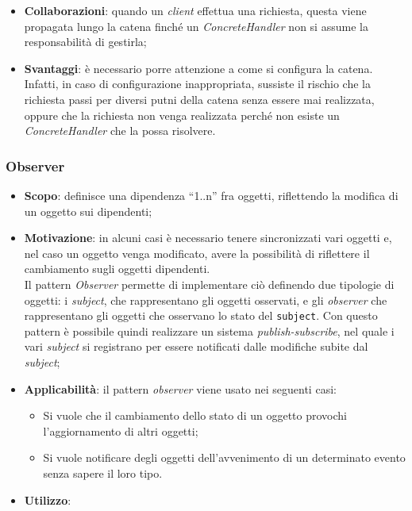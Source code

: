 \begin{itemize}
\item \textbf{Collaborazioni}: quando un \textit{client} effettua una richiesta, questa viene propagata lungo la catena finché un \textit{ConcreteHandler} non si assume la responsabilità di gestirla;
\item \textbf{Svantaggi}: è necessario porre attenzione a come si configura la catena. Infatti, in caso di configurazione inappropriata, sussiste il rischio che la richiesta passi per diversi putni della catena senza essere mai realizzata, oppure che la richiesta non venga realizzata perché non esiste un \textit{ConcreteHandler} che la possa risolvere.
\end{itemize}

\subsubsection{Observer}
\begin{itemize}
\item \textbf{Scopo}: definisce una dipendenza “1..n” fra oggetti, riflettendo la modifica di un oggetto sui dipendenti;
\item \textbf{Motivazione}: in alcuni casi è necessario tenere sincronizzati vari oggetti e, nel caso un oggetto venga modificato, avere la possibilità di riflettere il cambiamento sugli oggetti dipendenti. \\ Il pattern \textit{Observer} permette di implementare ciò definendo due tipologie di oggetti: i \textit{subject}, che rappresentano gli oggetti osservati, e gli \textit{observer} che rappresentano gli oggetti che osservano lo stato del \texttt{subject}. Con questo pattern è possibile quindi realizzare un sistema \textit{publish-subscribe}, nel quale i vari \textit{subject} si registrano per essere notificati dalle modifiche subite dal \textit{subject};
\item \textbf{Applicabilità}: il pattern \textit{observer} viene usato nei seguenti casi:
	\begin{itemize}
		\item Si vuole che il cambiamento dello stato di un oggetto provochi l'aggiornamento di altri oggetti;
		\item Si vuole notificare degli oggetti dell'avvenimento di un determinato evento senza sapere il loro tipo.
	\end{itemize}

\item \textbf{Utilizzo}:
\end{itemize}